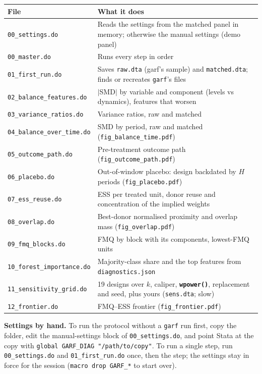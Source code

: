 \documentclass[11pt,a4paper]{article}
\newcommand{\opt}[1]{\texttt{\textbf{#1}}}
\newcommand{\code}[1]{\texttt{#1}}
\begin{document}
\medskip
\begin{tabularx}{\textwidth}{@{}lX@{}}
\toprule
File & What it does\\
\midrule
\code{00\_settings.do} & Reads the settings from the matched panel in memory; otherwise the manual settings (demo panel)\\
\code{00\_master.do} & Runs every step in order\\
\code{01\_first\_run.do} & Saves \code{raw.dta} (garf's sample) and \code{matched.dta}; finds or recreates \code{garf}'s files\\
\code{02\_balance\_features.do} & $|$SMD$|$ by variable and component (levels vs dynamics), features that worsen\\
\code{03\_variance\_ratios.do} & Variance ratios, raw and matched\\
\code{04\_balance\_over\_time.do} & SMD by period, raw and matched (\code{fig\_balance\_time.pdf})\\
\code{05\_outcome\_path.do} & Pre-treatment outcome path (\code{fig\_outcome\_path.pdf})\\
\code{06\_placebo.do} & Out-of-window placebo: design backdated by $H$ periods (\code{fig\_placebo.pdf})\\
\code{07\_ess\_reuse.do} & ESS per treated unit, donor reuse and concentration of the implied weights\\
\code{08\_overlap.do} & Best-donor normalised proximity and overlap mass (\code{fig\_overlap.pdf})\\
\code{09\_fmq\_blocks.do} & FMQ by block with its components, lowest-FMQ units\\
\code{10\_forest\_importance.do} & Majority-class share and the top features from \code{diagnostics.json}\\
\code{11\_sensitivity\_grid.do} & 19 designs over $k$, caliper, \opt{wpower()}, replacement and seed, plus yours (\code{sens.dta}; slow)\\
\code{12\_frontier.do} & FMQ--ESS frontier (\code{fig\_frontier.pdf})\\
\bottomrule
\end{tabularx}

\medskip
\noindent\textbf{Settings by hand.} To run the protocol without a \code{garf} run first, copy the
folder, edit the manual-settings block of \code{00\_settings.do}, and point Stata at the copy with
\code{global GARF\_DIAG "/path/to/copy"}. To run a single step, run \code{00\_settings.do} and
\code{01\_first\_run.do} once, then the step; the settings stay in force for the session
(\code{macro drop GARF\_*} to start over).
\end{document}
